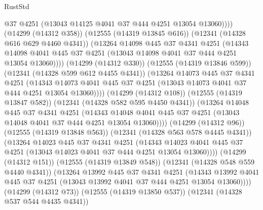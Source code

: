 \begin{lexlean}{RustStd}
\begin{coremodule}
                        @37
                        @4251
                        (@13043 @14125 @4041 @37 @444 @4251 @13054 @13060))))
                  (@14299 (@14312 @358))
                  (@12555 (@14319 @13845 @616))
                  (@12341 (@14328 @616 @629 @4460 @4341))
                  (@13264
                    @14098
                    @445
                    @37
                    @4341
                    @4251
                    (@14343
                      @14098
                      @4041
                      @445
                      @37
                      @4251
                      (@13043 @14098 @4041 @37 @444 @4251 @13054 @13060))))
                (@14299 (@14312 @330))
                (@12555 (@14319 @13846 @599))
                (@12341 (@14328 @599 @612 @4455 @4341))
                (@13264
                  @14073
                  @445
                  @37
                  @4341
                  @4251
                  (@14343
                    @14073
                    @4041
                    @445
                    @37
                    @4251
                    (@13043 @14073 @4041 @37 @444 @4251 @13054 @13060))))
              (@14299 (@14312 @108))
              (@12555 (@14319 @13847 @582))
              (@12341 (@14328 @582 @595 @4450 @4341))
              (@13264
                @14048
                @445
                @37
                @4341
                @4251
                (@14343
                  @14048
                  @4041
                  @445
                  @37
                  @4251
                  (@13043 @14048 @4041 @37 @444 @4251 @13054 @13060))))
            (@14299 (@14312 @96))
            (@12555 (@14319 @13848 @563))
            (@12341 (@14328 @563 @578 @4445 @4341))
            (@13264
              @14023
              @445
              @37
              @4341
              @4251
              (@14343
                @14023
                @4041
                @445
                @37
                @4251
                (@13043 @14023 @4041 @37 @444 @4251 @13054 @13060))))
          (@14299 (@14312 @151))
          (@12555 (@14319 @13849 @548))
          (@12341 (@14328 @548 @559 @4440 @4341))
          (@13264
            @13992
            @445
            @37
            @4341
            @4251
            (@14343
              @13992
              @4041
              @445
              @37
              @4251
              (@13043 @13992 @4041 @37 @444 @4251 @13054 @13060))))
        (@14299 (@14312 @73))
        (@12555 (@14319 @13850 @537))
        (@12341 (@14328 @537 @544 @4435 @4341))

\end{coremodule}
\end{lexlean}
